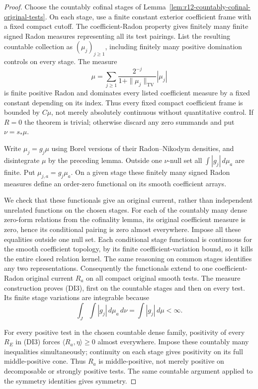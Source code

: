 \documentclass[11pt,a4paper]{article}
\numberwithin{equation}{section}
\theoremstyle{definition}
\theoremstyle{remark}
\begin{document}
\begin{proof}
Choose the countably cofinal stages of
Lemma~\ref{lem:r12-countably-cofinal-original-tests}. On each stage,
use a finite constant exterior coefficient frame with a fixed
compact cutoff. The coefficient-Radon property gives finitely many
finite signed Radon measures representing all its test pairings.
List the resulting countable collection as $(\mu_j)_{j\ge1}$,
including finitely many positive domination controls on every stage.
The measure
\[
            \mu=\sum_{j\ge1}
                    \frac{2^{-j}}{1+\|\mu_j\|_{\mathrm{TV}}}|\mu_j|
 \tag{DI5}
\]
is finite positive Radon and dominates every listed coefficient
measure by a fixed constant depending on its index. Thus every
fixed compact coefficient frame is bounded by $C\mu$, not merely
absolutely continuous without quantitative control.
If $R=0$ the theorem is trivial; otherwise discard any
zero summands and put $\nu=s_*\mu$.

Write $\mu_j=g_j\mu$ using Borel versions of their Radon--Nikodym
densities, and disintegrate $\mu$ by the preceding lemma. Outside
one $\nu$-null set all $\int|g_j|\,d\mu_a$ are finite. Put
$\mu_{j,a}=g_j\mu_a$. On a given stage these finitely many signed
Radon measures define an order-zero functional on its smooth
coefficient arrays.

We check that these functionals give an original current, rather
than independent unrelated functions on the chosen stages. For
each of the countably many dense zero-form relations from the
cofinality lemma, its original coefficient measure is zero, hence
its conditional pairing is zero almost everywhere. Impose all
these equalities outside one null set. Each conditional stage
functional is continuous for the smooth coefficient topology,
by its finite coefficient-variation bound, so it kills the entire
closed relation kernel. The same reasoning on common stages
identifies any two representations. Consequently the functionals
extend to one coefficient-Radon original current $R_a$ on all
compact original smooth tests. The measure construction proves
(DI3), first on the countable stages and then on every test.
Its finite stage variations are integrable because
\[
                 \int_J\int|g_j|\,d\mu_a\,d\nu
                                           =\int|g_j|\,d\mu<\infty.
 \tag{DI6}
\]

For every positive test in the chosen countable dense family,
positivity of every $R_E$ in (DI3) forces
$\langle R_a,\eta\rangle\ge0$ almost everywhere. Impose these
countably many inequalities simultaneously; continuity on each
stage gives positivity on its full middle-positive cone. Thus
$R_a$ is middle-positive, not merely positive on decomposable or
strongly positive tests. The same countable argument applied to
the symmetry identities gives symmetry.


\end{proof}
\end{document}
